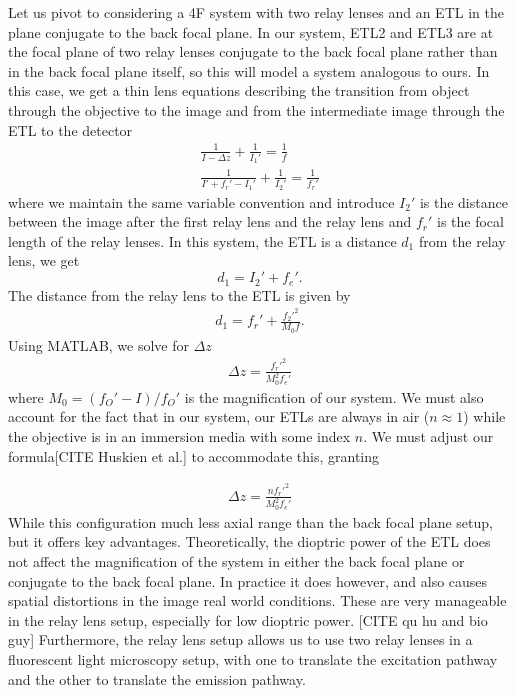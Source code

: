 \par Let us pivot to considering a 4F system with two relay lenses and an ETL in the plane conjugate to the back focal plane. In our system, ETL2 and ETL3 are at the focal plane of two relay lenses conjugate to the back focal plane rather than in the back focal plane itself, so this will model a system analogous to ours. In this case, we get a thin lens equations describing the transition from object through the objective to the image and from the intermediate image through the ETL to the detector
\begin{gather}
	\frac{1}{I-\Delta z}+\frac 1{I_1'} = \frac 1{f}\\
	\frac{1}{I' + f_r' - I_1'}+\frac1{I_2'} = \frac{1}{f_r'}
\end{gather}
where we maintain the same variable convention and introduce $I_2'$ is the distance between the image after the first relay lens and the relay lens and $f_r'$ is the focal length of the relay lenses. In this system, the ETL is a distance $d_1$ from the relay lens, we get
 \begin{equation}
	d_1 = I_2' + f_e'.
\end{equation}
The distance from the relay lens to the ETL is given by %
\begin{gather}
	d_1 = f_r' + \frac{f_2'^2}{M_0f}.
\end{gather}
Using MATLAB, we solve for $\Delta z$
\begin{gather}
	\Delta z = %
	\frac{f_r'^2}{M_0^2 f_e'}
\end{gather}
where $M_0 = (f_O'-I)/f_O'$ is the magnification of our system. We must also account for the fact that in our system, our ETLs are always in air ($n\approx 1$) while the objective is in an immersion media with some index $n$. We must adjust our formula[CITE Huskien et al.] to accommodate this, granting\par
\begin{gather}
	\Delta z = \frac{nf_r'^2}{M_0^2 f_e'}
\end{gather}
While this configuration much less axial range than the back focal plane setup, but it offers key advantages. Theoretically, the dioptric power of the ETL does not affect the magnification of the system in either the back focal plane or conjugate to the back focal plane. In practice it does however, and also causes spatial distortions in the image real world conditions. These are very manageable in the relay lens setup, especially for low dioptric power. [CITE qu hu and bio guy] Furthermore, the relay lens setup allows us to use two relay lenses in a fluorescent light microscopy setup, with one to translate the excitation pathway and the other to translate the emission pathway.
